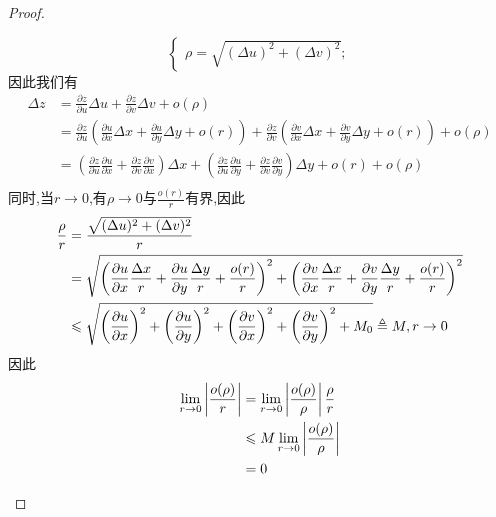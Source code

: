 \begin{proof}
\begin{enumerate}
$$\begin{cases}
                \rho =\sqrt{(\Delta u)^2+(\Delta v)^2};
                \end{cases}$$
            因此我们有
            \begin{align*}
                \Delta z
                &=\frac{\partial z}{\partial u}\Delta u+\frac{\partial z}{\partial v}\Delta v + o(\rho)\\
                &=\frac{\partial z}{\partial u} \left(\frac{\partial u}{\partial x}\Delta x+\frac{\partial u}{\partial y}\Delta y+o(r)\right) 
                + \frac{\partial z}{\partial v} \left(\frac{\partial v}{\partial x}\Delta x+\frac{\partial v}{\partial y}\Delta y+o(r)\right) + o(\rho)\\
                &=\left(\frac{\partial z}{\partial u}\frac{\partial u}{\partial x}+\frac{\partial z}{\partial v}\frac{\partial v}{\partial x}\right)\Delta x
                + \left(\frac{\partial z}{\partial u}\frac{\partial u}{\partial y}+\frac{\partial z}{\partial v}\frac{\partial v}{\partial y}\right)\Delta y + o(r) + o(\rho)\\
            \end{align*}
            同时,当$r\to 0$,有$\rho\to0$与$\frac{o(r)}{r}$有界,因此
            \begin{align*}
                \frac{\rho}{r}
                &=\frac{\sqrt{(\Delta u)^2+(\Delta v)^2}}{r}\\
                &=\sqrt
                {\left(\frac{\partial u}{\partial x}\frac{\Delta x}{r}+\frac{\partial u}{\partial y}\frac{\Delta y}{r}+\frac{o(r)}{r}\right)^2
                +\left(\frac{\partial v}{\partial x}\frac{\Delta x}{r}+\frac{\partial v}{\partial y}\frac{\Delta y}{r}+\frac{o(r)}{r}\right)^2}\\
                &\leqslant \sqrt
                {\left(\frac{\partial u}{\partial x}\right)^2
                +\left(\frac{\partial u}{\partial y}\right)^2
                +\left(\frac{\partial v}{\partial x}\right)^2
                +\left(\frac{\partial v}{\partial y}\right)^2
                +M_0}\triangleq M,r\to0
            \end{align*}
            因此
            \begin{align*}
                \lim_{r\to 0}\left|\frac{o(\rho)}{r}\right|
                &=\lim_{r\to 0}\left|\frac{o(\rho)}{\rho}\right|\frac{\rho}{r}\\
                &\leqslant M\lim_{r\to 0} \left|\frac{o(\rho)}{\rho}\right|\\
                &=0
            \end{align*}

\end{enumerate}
\end{proof}

